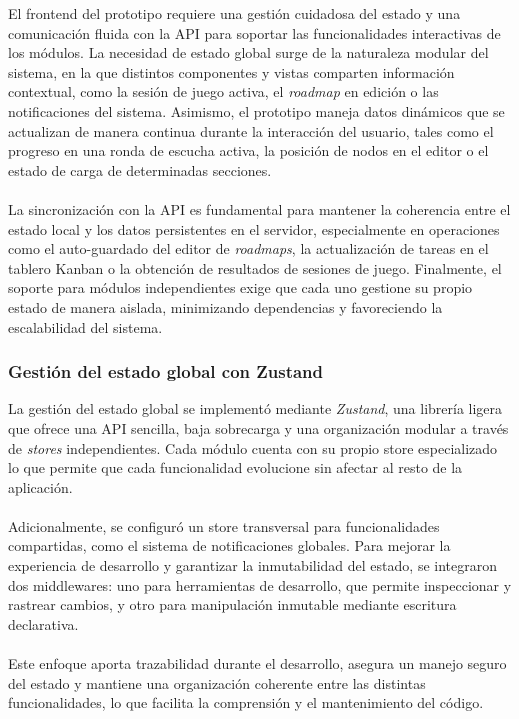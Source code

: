 El frontend del prototipo requiere una gestión cuidadosa del estado y una comunicación fluida con la API para soportar las funcionalidades interactivas de los módulos. La necesidad de estado global surge de la naturaleza modular del sistema, en la que distintos componentes y vistas comparten información contextual, como la sesión de juego activa, el \textit{roadmap} en edición o las notificaciones del sistema. Asimismo, el prototipo maneja datos dinámicos que se actualizan de manera continua durante la interacción del usuario, tales como el progreso en una ronda de escucha activa, la posición de nodos en el editor o el estado de carga de determinadas secciones.
\\
\\
La sincronización con la API es fundamental para mantener la coherencia entre el estado local y los datos persistentes en el servidor, especialmente en operaciones como el auto-guardado del editor de \textit{roadmaps}, la actualización de tareas en el tablero Kanban o la obtención de resultados de sesiones de juego. Finalmente, el soporte para módulos independientes exige que cada uno gestione su propio estado de manera aislada, minimizando dependencias y favoreciendo la escalabilidad del sistema.

\subsubsection{Gestión del estado global con Zustand}

La gestión del estado global se implementó mediante \textit{Zustand}, una librería ligera que ofrece una API sencilla, baja sobrecarga y una organización modular a través de \textit{stores} independientes. Cada módulo cuenta con su propio store especializado lo que permite que cada funcionalidad evolucione sin afectar al resto de la aplicación.
\\
\\
Adicionalmente, se configuró un store transversal para funcionalidades compartidas, como el sistema de notificaciones globales. Para mejorar la experiencia de desarrollo y garantizar la inmutabilidad del estado, se integraron dos middlewares: uno para herramientas de desarrollo, que permite inspeccionar y rastrear cambios, y otro para manipulación inmutable mediante escritura declarativa.
\\
\\
Este enfoque aporta trazabilidad durante el desarrollo, asegura un manejo seguro del estado y mantiene una organización coherente entre las distintas funcionalidades, lo que facilita la comprensión y el mantenimiento del código.

